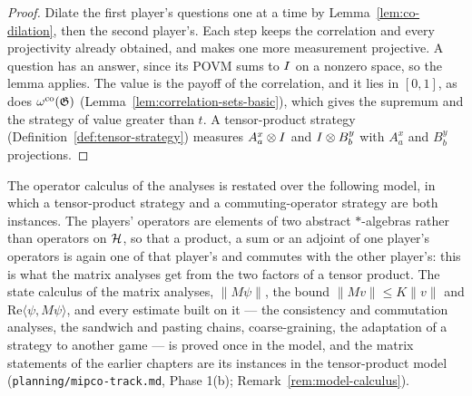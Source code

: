 \begin{proof}
\leanok
Dilate the first player's questions one at a time by Lemma~\ref{lem:co-dilation}, then the
second player's. Each step keeps the correlation and every projectivity already obtained, and
makes one more measurement projective. A question has an answer, since its POVM sums to $I$ on
a nonzero space, so the lemma applies. The value is the payoff of the correlation, and it
lies in $[0, 1]$, as does $\omega^{\mathrm{co}}(\mathfrak{G})$ (Lemma~\ref{lem:correlation-sets-basic}), which
gives the supremum and the strategy of value greater than $t$. A tensor-product strategy
(Definition~\ref{def:tensor-strategy}) measures $A^x_a \otimes I$ and $I \otimes B^y_b$ with
$A^x_a$ and $B^y_b$ projections.
\end{proof}

The operator calculus of the analyses is restated over the following model, in which a
tensor-product strategy and a commuting-operator strategy are both instances. The players'
operators are elements of two abstract $*$-algebras rather than operators on $\mathcal{H}$, so that a
product, a sum or an adjoint of one player's operators is again one of that player's and commutes
with the other player's: this is what the matrix analyses get from the two factors of a tensor
product. The state calculus of the matrix analyses, $\|M\psi\|$, the bound $\|Mv\| \leq K\|v\|$
and $\mathrm{Re}\langle \psi, M\psi \rangle$, and every estimate built on it --- the consistency
and commutation analyses, the sandwich and pasting chains, coarse-graining, the adaptation of a
strategy to another game --- is proved once in the model, and the matrix statements of the
earlier chapters are its instances in the tensor-product model
(\texttt{planning/mipco-track.md}, Phase 1(b); Remark~\ref{rem:model-calculus}).

